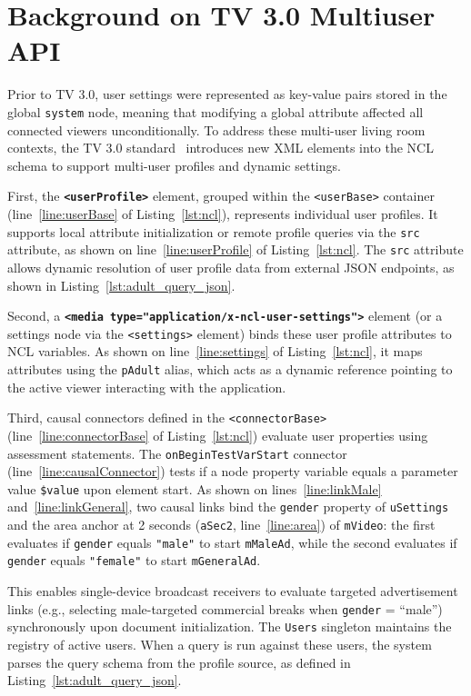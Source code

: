 \documentclass[sigconf,authorversion,review,authordraft]{webmedia}
\begin{document}
\section{Background on TV 3.0 Multiuser API}
\label{sec:background}

Prior to TV 3.0, user settings were represented as key-value pairs stored in the global \texttt{system} node, meaning that modifying a global attribute affected all connected viewers unconditionally. To address these multi-user living room contexts, the TV 3.0 standard~\cite{abnt_15608_4} introduces new XML elements into the NCL schema to support multi-user profiles and dynamic settings.

First, the {\small\textbf{\texttt{<userProfile>}}} element, grouped within the \texttt{<userBase>} container (line~\ref{line:userBase} of Listing~\ref{lst:ncl}), represents individual user profiles. It supports local attribute initialization or remote profile queries via the \texttt{src} attribute, as shown on line~\ref{line:userProfile} of Listing~\ref{lst:ncl}. The \texttt{src} attribute allows dynamic resolution of user profile data from external JSON endpoints, as shown in Listing~\ref{lst:adult_query_json}.

Second, a {\small\textbf{\texttt{<media type="application/x-ncl-user-settings">}}} \newline element (or a settings node via the \texttt{<settings>} element) binds these user profile attributes to NCL variables. As shown on line~\ref{line:settings} of Listing~\ref{lst:ncl}, it maps attributes using the \texttt{pAdult} alias, which acts as a dynamic reference pointing to the active viewer interacting with the application.

Third, causal connectors defined in the \texttt{<connectorBase>} (line~\ref{line:connectorBase} of Listing~\ref{lst:ncl}) evaluate user properties using assessment statements. The \texttt{onBeginTestVarStart} connector (line~\ref{line:causalConnector}) tests if a node property variable equals a parameter value \texttt{\$value} upon element start. As shown on lines~\ref{line:linkMale} and~\ref{line:linkGeneral}, two causal links bind the \texttt{gender} property of \texttt{uSettings} and the area anchor at 2 seconds (\texttt{aSec2}, line~\ref{line:area}) of \texttt{mVideo}: the first evaluates if \texttt{gender} equals \texttt{"male"} to start \texttt{mMaleAd}, while the second evaluates if \texttt{gender} equals \texttt{"female"} to start \texttt{mGeneralAd}.

This enables single-device broadcast receivers to evaluate targeted advertisement links (e.g., selecting male-targeted commercial breaks when \texttt{gender} = ``male'') synchronously upon document initialization. The \texttt{Users} singleton maintains the registry of active users. When a query is run against these users, the system parses the query schema from the profile source, as defined in Listing~\ref{lst:adult_query_json}.
\end{document}
